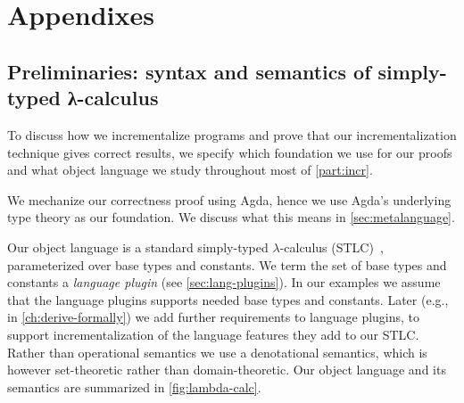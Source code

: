 









\def\deriveDefCore{%
\begin{align*}
  \ensuremath{\Derive{\lambda (\Varid{x}\typcolon\sigma)\to \Varid{t}}} &= \ensuremath{\lambda (\Varid{x}\typcolon\sigma)\;(\Varid{dx}\typcolon\Delta \sigma)\to \Derive{\Varid{t}}} \\
  \ensuremath{\Derive{\Varid{s}\;\Varid{t}}} &= \ensuremath{\Derive{\Varid{s}}\;\Varid{t}\;\Derive{\Varid{t}}} \\
  \ensuremath{\Derive{\Varid{x}}} &= \ensuremath{\Varid{dx}} \\
  \ensuremath{\Derive{\Varid{c}}} &= \ensuremath{\DeriveConst{\Varid{c}}}
\end{align*}
}




\part*{Appendixes}

\chapter[Preliminaries]{Preliminaries: syntax and semantics of
  simply-typed λ-calculus}
\label{sec:preliminaries}

To discuss how we incrementalize programs and prove that
our incrementalization technique gives correct results, we specify
which foundation we use for our proofs and what object language we
study throughout most of \cref{part:incr}.

We mechanize our correctness proof using Agda, hence we use
Agda's underlying type theory as our foundation. We discuss
what this means in \cref{sec:metalanguage}.

Our object language is a standard simply-typed $\lambda$-calculus
(STLC)~\citep[Ch.~9]{Pierce02TAPL}, parameterized over base types
and constants. We term the set of base types and constants a
\emph{language plugin} (see \cref{sec:lang-plugins}). In our
examples we assume that the language plugins supports needed base
types and constants. Later (e.g., in \cref{ch:derive-formally})
we add further requirements to language plugins, to support
incrementalization of the language features they add to our STLC\@.
%
Rather than operational semantics we use a denotational
semantics, which is however set-theoretic rather than
domain-theoretic. Our object language and its semantics are
summarized in \cref{fig:lambda-calc}.

